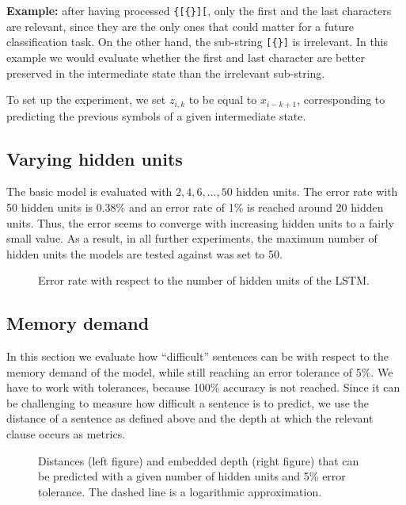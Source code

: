 \documentclass[11pt,a4paper]{article}
\newlength\figureheight
\newlength\figurewidth
\begin{document}
\textbf{Example:} after having processed \verb|{[{}][|, only the first and the last characters are relevant, since they are the only ones that could matter for a future classification task. On the other hand, the sub-string \verb|[{}]| is irrelevant. In this example we would evaluate whether the first and last character are better preserved in the intermediate state than the irrelevant sub-string.

To set up the experiment, we set $z_{i,k}$ to be equal to $x_{i-k+1}$, corresponding to predicting the previous symbols of a given intermediate state.

\subsection{Varying hidden units}
\label{subsec:varying_hidden_units}

The basic model is evaluated with $2,4,6,...,50$ hidden units. The error rate with 50 hidden units is 0.38\% and an error rate of 1\% is reached around 20 hidden units.  Thus, the error seems to converge with increasing hidden units to a fairly small value. As a result, in all further experiments, the maximum number of hidden units the models are tested against was set to 50.

\setlength\figureheight{4cm}
\setlength\figurewidth{\linewidth}
\begin{figure}[ht]
    \caption{Error rate with respect to the number of hidden units of the LSTM.}%
    \label{fig:varying_units_results}%
\end{figure}

\subsection{Memory demand}
\label{subsec:memory_demand}

In this section we evaluate how ``difficult'' sentences can be with respect to the memory demand of the model, while still reaching an error tolerance of 5\%. We have to work with tolerances, because 100\% accuracy is not reached. Since it can be challenging to measure how difficult a sentence is to predict, we use the distance of a sentence as defined above and the depth at which the relevant clause occurs as metrics.

\setlength\figureheight{5cm}
\setlength{}
\begin{figure*}[ht]
    \qquad
    
    \caption{Distances (left figure) and embedded depth (right figure) that can be predicted with a given number of hidden units and 5\% error tolerance. The dashed line is a logarithmic approximation.}%
    \label{fig:memory_demand}%
\end{figure*}
\end{document}
